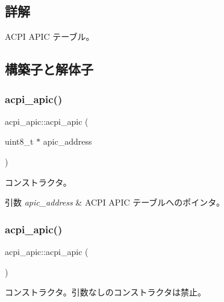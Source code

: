 \subsection{詳解}
A\+C\+PI A\+P\+IC テーブル。 

\subsection{構築子と解体子}
\hypertarget{classacpi__apic_aaa636a85e07fb4355d12635280edf517}{}\label{classacpi__apic_aaa636a85e07fb4355d12635280edf517} 
\subsubsection{\texorpdfstring{acpi\+\_\+apic()}{acpi\_apic()}\hspace{0.1cm}{\footnotesize\ttfamily [1/4]}}
{\footnotesize\ttfamily acpi\+\_\+apic\+::acpi\+\_\+apic (\begin{DoxyParamCaption}\item[{uint8\+\_\+t $\ast$}]{apic\+\_\+address }\end{DoxyParamCaption})}

コンストラクタ。 
\begin{DoxyParams}{引数}
{\em apic\+\_\+address} & A\+C\+PI A\+P\+IC テーブルへのポインタ。 \\
\hline
\end{DoxyParams}
\hypertarget{classacpi__apic_a3f8164e9adb40eb5c2c27f126a397715}{}\label{classacpi__apic_a3f8164e9adb40eb5c2c27f126a397715} 
\subsubsection{\texorpdfstring{acpi\+\_\+apic()}{acpi\_apic()}\hspace{0.1cm}{\footnotesize\ttfamily [2/4]}}
{\footnotesize\ttfamily acpi\+\_\+apic\+::acpi\+\_\+apic (\begin{DoxyParamCaption}{ }\end{DoxyParamCaption})\hspace{0.3cm}{\ttfamily [delete]}}

コンストラクタ。引数なしのコンストラクタは禁止。 \hypertarget{classacpi__apic_a81f721dc4a7e4e5d765e3a0c453a3e79}{}\label{classacpi__apic_a81f721dc4a7e4e5d765e3a0c453a3e79} 
